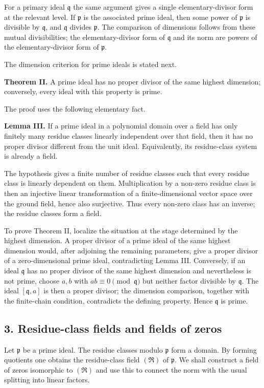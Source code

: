 \documentclass[11pt]{article}
\begin{document}
For a primary ideal $\mathfrak q$ the same argument gives a single elementary-divisor form at the relevant level. If $\mathfrak p$ is the associated prime ideal, then some power of $\mathfrak p$ is divisible by $\mathfrak q$, and $\mathfrak q$ divides $\mathfrak p$. The comparison of dimensions follows from these mutual divisibilities; the elementary-divisor form of $\mathfrak q$ and its norm are powers of the elementary-divisor form of $\mathfrak p$.

The dimension criterion for prime ideals is stated next.

\textbf{Theorem II.} A prime ideal has no proper divisor of the same highest dimension; conversely, every ideal with this property is prime.

The proof uses the following elementary fact.

\textbf{Lemma III.} If a prime ideal in a polynomial domain over a field has only finitely many residue classes linearly independent over that field, then it has no proper divisor different from the unit ideal. Equivalently, its residue-class system is already a field.

The hypothesis gives a finite number of residue classes such that every residue class is linearly dependent on them. Multiplication by a non-zero residue class is then an injective linear transformation of a finite-dimensional vector space over the ground field, hence also surjective. Thus every non-zero class has an inverse; the residue classes form a field.

To prove Theorem II, localize the situation at the stage determined by the highest dimension. A proper divisor of a prime ideal of the same highest dimension would, after adjoining the remaining parameters, give a proper divisor of a zero-dimensional prime ideal, contradicting Lemma III. Conversely, if an ideal $\mathfrak q$ has no proper divisor of the same highest dimension and nevertheless is not prime, choose $a,b$ with $ab\equiv0\pmod{\mathfrak q}$ but neither factor divisible by $\mathfrak q$. The ideal $[\mathfrak q,a]$ is then a proper divisor; the dimension comparison, together with the finite-chain condition, contradicts the defining property. Hence $\mathfrak q$ is prime.

\subsection{3. Residue-class fields and fields of zeros}

Let $\mathfrak p$ be a prime ideal. The residue classes modulo $\mathfrak p$ form a domain. By forming quotients one obtains the residue-class field $(\mathfrak R)$ of $\mathfrak p$. We shall construct a field of zeros isomorphic to $(\mathfrak R)$ and use this to connect the norm with the usual splitting into linear factors.
\end{document}
